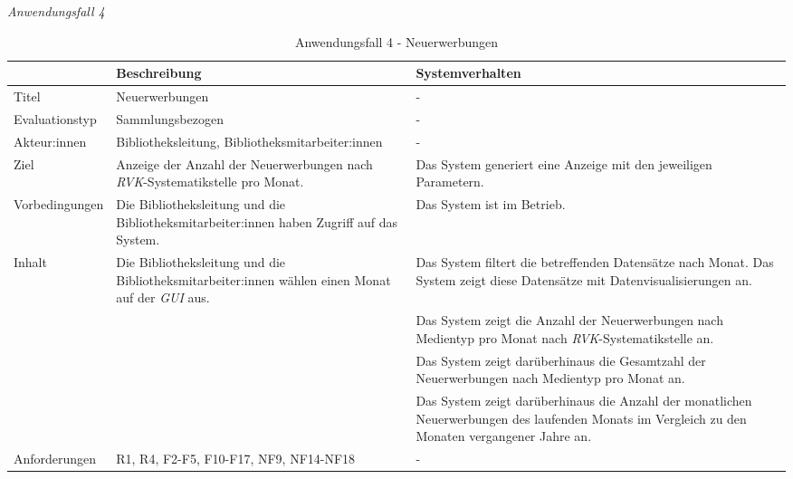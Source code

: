 \newpage
\noindent
\textit{Anwendungsfall 4}

\begingroup
\setlength{\tabcolsep}{10pt} %
\renewcommand{\arraystretch}{1.25} 
\begin{table}[h]
    \centering
    \begin{adjustbox}{max width=\textwidth}
    \begin{tabular}{lp{7.0cm}p{7.0cm}}
       \toprule
       \textbf{}          & \textbf{Beschreibung} &\textbf{Systemverhalten}\\
       \midrule
        Titel                            &Neuerwerbungen& -\\
        Evaluationstyp                   &Sammlungsbezogen                   & -\\
        Akteur:innen                     &Bibliotheksleitung, Bibliotheksmitarbeiter:innen& -\\
        Ziel                             &Anzeige der Anzahl der Neuerwerbungen nach \textit{\acrshort{RVK}}-Systematikstelle pro Monat.& Das System generiert eine Anzeige mit den jeweiligen Parametern.\\
        Vorbedingungen                   &Die Bibliotheksleitung und die Bibliotheksmitarbeiter:innen haben Zugriff auf das System.& Das System ist im Betrieb.\\
        Inhalt                           &Die Bibliotheksleitung und die Bibliotheksmitarbeiter:innen wählen einen Monat auf der \textit{\acrshort{GUI}} aus.& Das System filtert die betreffenden Datensätze nach Monat. Das System zeigt diese Datensätze mit Datenvisualisierungen an.\\
                                        & &Das System zeigt die Anzahl der Neuerwerbungen nach Medientyp pro Monat nach \textit{\acrshort{RVK}}-Systematikstelle an.\\
                                        & &Das System zeigt darüberhinaus die Gesamtzahl der Neuerwerbungen nach Medientyp pro Monat an.\\
                                        & &Das System zeigt darüberhinaus die Anzahl der monatlichen Neuerwerbungen des laufenden Monats im Vergleich zu den Monaten vergangener Jahre an.\\

        Anforderungen                   &R1, R4, F2-F5, F10-F17, NF9, NF14-NF18& -\\
        \bottomrule
    \end{tabular}
    \end{adjustbox}
    \caption{%
    Anwendungsfall 4 - Neuerwerbungen    }
    \label{tab:AF_Neuerwerbungen}
    \end{table}
\endgroup



